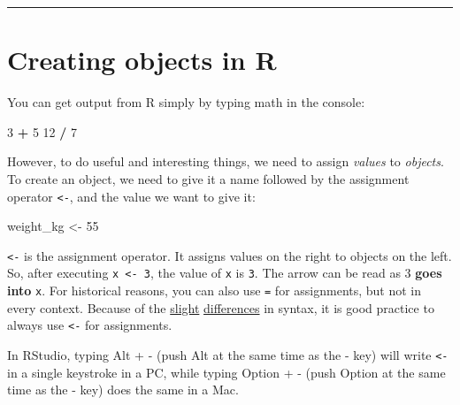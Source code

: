\documentclass[]{book}
\newenvironment{Shaded}{\begin{snugshade}}{\end{snugshade}}
\newcommand{\DecValTok}[1]{\textcolor[rgb]{0.00,0.00,0.81}{#1}}
\newcommand{\StringTok}[1]{\textcolor[rgb]{0.31,0.60,0.02}{#1}}
\newcommand{\OperatorTok}[1]{\textcolor[rgb]{0.81,0.36,0.00}{\textbf{#1}}}
\newcommand{\NormalTok}[1]{#1}
\begin{document}
\begin{center}\rule{0.5\linewidth}{\linethickness}\end{center}

\section{Creating objects in R}\label{creating-objects-in-r}

You can get output from R simply by typing math in the console:

\begin{Shaded}
\begin{Highlighting}[]
\DecValTok{3} \OperatorTok{+}\StringTok{ }\DecValTok{5}
\DecValTok{12} \OperatorTok{/}\StringTok{ }\DecValTok{7}
\end{Highlighting}
\end{Shaded}

However, to do useful and interesting things, we need to assign
\emph{values} to \emph{objects}. To create an object, we need to give it
a name followed by the assignment operator \texttt{\textless{}-}, and
the value we want to give it:

\begin{Shaded}
\begin{Highlighting}[]
\NormalTok{weight_kg <-}\StringTok{ }\DecValTok{55}
\end{Highlighting}
\end{Shaded}

\texttt{\textless{}-} is the assignment operator. It assigns values on
the right to objects on the left. So, after executing
\texttt{x\ \textless{}-\ 3}, the value of \texttt{x} is \texttt{3}. The
arrow can be read as 3 \textbf{goes into} \texttt{x}. For historical
reasons, you can also use \texttt{=} for assignments, but not in every
context. Because of the
\href{http://blog.revolutionanalytics.com/2008/12/use-equals-or-arrow-for-assignment.html}{slight}
\href{http://r.789695.n4.nabble.com/Is-there-any-difference-between-and-tp878594p878598.html}{differences}
in syntax, it is good practice to always use \texttt{\textless{}-} for
assignments.

In RStudio, typing Alt + - (push Alt at the same time as the - key) will
write \texttt{\textless{}-} in a single keystroke in a PC, while typing
Option + - (push Option at the same time as the - key) does the same in
a Mac.
\end{document}
